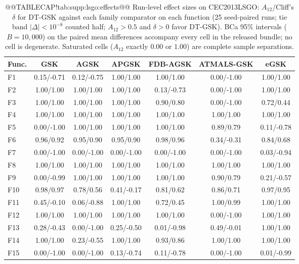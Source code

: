 \documentclass[10pt,a4paper]{article}
\newcommand{\dtgsk}{DT-GSK}
\begin{document}
\begin{table}[p]
\caption{@@TABLECAP!tab:supp:lsgo:effects@@ Run-level effect sizes on CEC2013LSGO: $A_{12}$/Cliff's
$\delta$ for \dtgsk{} against each family comparator on each function
(25 seed-paired runs; tie band $|\Delta| < 10^{-8}$ counted half;
$A_{12} > 0.5$ and $\delta > 0$ favor \dtgsk{}).  BCa 95\% intervals
($B = 10{,}000$) on the paired mean differences accompany every cell in
the released bundle; no cell is degenerate.  Saturated cells ($A_{12}$
exactly $0.00$ or $1.00$) are complete sample separations.
}\label{tab:supp:lsgo:effects}



\zebra
\begin{tabular}{lcccccc}
\toprule
\textbf{Func.} & \textbf{GSK} & \textbf{AGSK} & \textbf{APGSK} & \textbf{FDB-AGSK} & \textbf{ATMALS-GSK} & \textbf{eGSK} \\
\midrule
F1 & 0.15/-0.71 & 0.12/-0.75 & 1.00/1.00 & 1.00/1.00 & 0.00/-1.00 & 1.00/1.00 \\
F2 & 1.00/1.00 & 1.00/1.00 & 1.00/1.00 & 0.13/-0.73 & 0.00/-1.00 & 1.00/1.00 \\
F3 & 1.00/1.00 & 1.00/1.00 & 1.00/1.00 & 0.90/0.80 & 0.00/-1.00 & 0.72/0.44 \\
F4 & 1.00/1.00 & 1.00/1.00 & 1.00/1.00 & 1.00/1.00 & 1.00/1.00 & 1.00/1.00 \\
F5 & 0.00/-1.00 & 1.00/1.00 & 1.00/1.00 & 1.00/1.00 & 0.89/0.79 & 0.11/-0.78 \\
F6 & 0.96/0.92 & 0.95/0.90 & 0.95/0.90 & 0.98/0.96 & 0.34/-0.31 & 0.84/0.68 \\
F7 & 0.00/-1.00 & 0.00/-1.00 & 0.00/-1.00 & 0.00/-1.00 & 0.00/-1.00 & 0.03/-0.94 \\
F8 & 1.00/1.00 & 1.00/1.00 & 1.00/1.00 & 1.00/1.00 & 1.00/1.00 & 1.00/1.00 \\
F9 & 0.00/-0.99 & 1.00/1.00 & 1.00/1.00 & 1.00/1.00 & 0.90/0.79 & 0.21/-0.57 \\
F10 & 0.98/0.97 & 0.78/0.56 & 0.41/-0.17 & 0.81/0.62 & 0.86/0.71 & 0.97/0.95 \\
F11 & 0.45/-0.10 & 0.06/-0.88 & 1.00/1.00 & 0.72/0.45 & 1.00/0.99 & 1.00/1.00 \\
F12 & 1.00/1.00 & 1.00/1.00 & 1.00/1.00 & 1.00/1.00 & 0.00/-1.00 & 1.00/1.00 \\
F13 & 0.28/-0.43 & 0.00/-1.00 & 0.25/-0.50 & 0.01/-0.98 & 0.49/-0.01 & 1.00/1.00 \\
F14 & 1.00/1.00 & 0.23/-0.55 & 1.00/1.00 & 0.93/0.86 & 1.00/1.00 & 1.00/1.00 \\
F15 & 0.00/-1.00 & 0.00/-1.00 & 0.13/-0.74 & 0.11/-0.78 & 0.00/-1.00 & 0.01/-0.99 \\
\bottomrule
\end{tabular}
\end{table}
\end{document}
